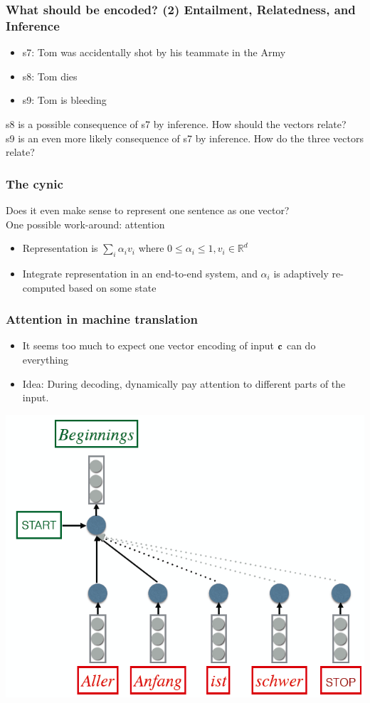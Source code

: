 \documentclass{beamer}
\newcommand{\bi}{\begin{itemize}}
\newcommand{\ei}{\end{itemize}}
\begin{document}
\begin{frame}
\frametitle{What should be encoded? (2) Entailment, Relatedness, and Inference}
\bi
\item s7: Tom was accidentally shot by his teammate in the Army
\item s8: Tom dies
\item s9: Tom is bleeding
\ei
 s8 is a possible consequence of s7 by inference. How should the vectors relate? \\[0.2cm]
 s9 is an even more likely consequence of s7 by inference. How do the three vectors relate?
\end{frame}


\begin{frame}
\frametitle{The cynic}
Does it even make sense to represent one sentence as one vector? \\[0.2cm]
One possible work-around: attention
\bi
\item Representation is $\sum_i \alpha_i v_i$ where $ 0 \leq \alpha_i \leq 1, v_i \in \mathbb{R}^d$
\item Integrate representation in an end-to-end system, and $\alpha_i$ is adaptively re-computed based on some state
\ei
\end{frame}


\begin{frame}
\frametitle{Attention in machine translation \cite{bahdanau14translate}}
\bi
\item It seems too much to expect one vector encoding of input $\bf{c}$ can do everything\pause
\item Idea: During decoding, dynamically {\color{red} pay attention} to different parts of the input.
\ei
\pause
\centerline{\includegraphics[scale=0.33]{figs/explain_attention1}}
\end{frame}
\end{document}
